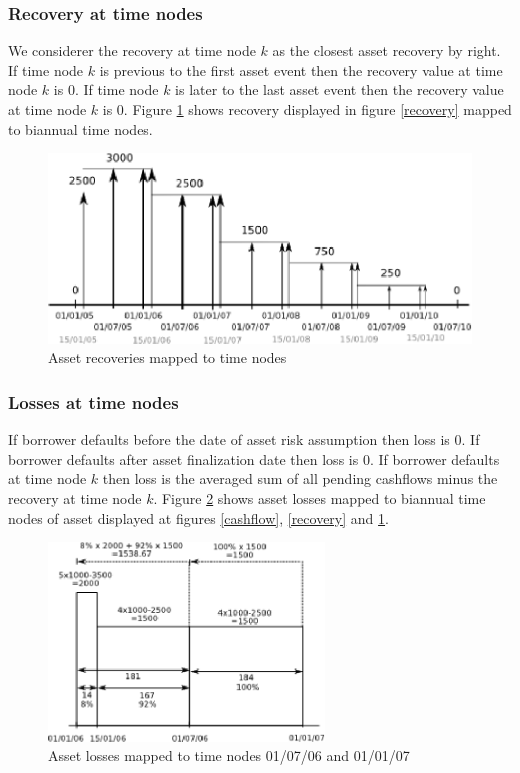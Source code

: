\documentclass[a4paper,12pt,final]{article}
\begin{document}
\subsubsection{Recovery at time nodes}
We considerer the recovery at time node $k$ as the closest asset recovery by 
right. If time node $k$ is previous to the first asset event then the recovery 
value at time node $k$ is $0$. If time node $k$ is later to the last asset event 
then the recovery value at time node $k$ is $0$. Figure \ref{recoverymapping} 
shows recovery displayed in figure \ref{recovery} mapped to biannual time nodes.

\begin{figure}[!hb]
\begin{center}
\includegraphics[width=12cm, angle=0]{./images/recoverymapping.eps}
\caption{Asset recoveries mapped to time nodes}
\label{recoverymapping}
\end{center}
\end{figure}

\subsubsection{Losses at time nodes}
If borrower defaults before the date of asset risk assumption then loss is $0$.
If borrower defaults after asset finalization date then loss is $0$. 
If borrower defaults at time node $k$ then loss is the averaged sum of all 
pending cashflows minus the recovery at time node $k$.
Figure \ref{lossesmapping} shows asset losses mapped to biannual time nodes of 
asset displayed at figures \ref{cashflow}, \ref{recovery} and \ref{recoverymapping}.

\begin{figure}[!hb]
\begin{center}
\includegraphics[width=7.34cm, angle=0]{./images/lossesmapping.eps}
\caption{Asset losses mapped to time nodes 01/07/06 and 01/01/07}
\label{lossesmapping}
\end{center}
\end{figure}
\end{document}
